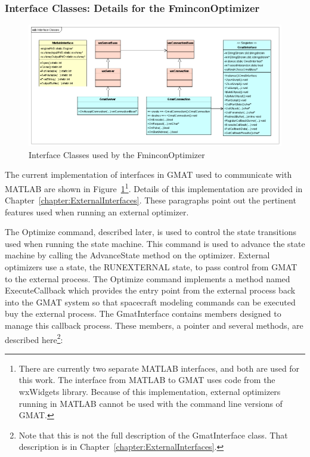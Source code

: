 \subsubsection{Interface Classes: Details for the FminconOptimizer}

\begin{figure}[htb]
\begin{center}
\includegraphics[460,221]{Images/InterfaceClasses.png}
\caption{\label{figure:InterfaceClasses}Interface Classes used by the FminconOptimizer}
\end{center}
\end{figure}

The current implementation of interfaces in GMAT used to communicate with MATLAB are shown in
Figure~\ref{figure:InterfaceClasses}\footnote{There are currently two separate MATLAB interfaces,
and both are used for this work.  The interface from MATLAB to GMAT uses code from the wxWidgets
library.  Because of this implementation, external optimizers running in MATLAB cannot be used with
the command line versions of GMAT.}.  Details of this implementation are provided in
Chapter~\ref{chapter:ExternalInterfaces}.  These paragraphs point out the pertinent features used
when running an external optimizer.

The Optimize command, described later, is used to control the state transitions used when running
the state machine.  This command is used to advance the state machine by calling the AdvanceState
method on the optimizer.  External optimizers use a state, the RUNEXTERNAL state, to pass control
from GMAT to the external process.  The Optimize command implements a method named ExecuteCallback
which provides the entry point from the external process back into the GMAT system so that
spacecraft modeling commands can be executed buy the external process.  The GmatInterface contains
members designed to manage this callback process.  These members, a pointer and several methods, are
described here\footnote{Note that this is not the full description of the GmatInterface class. That
description is in Chapter~\ref{chapter:ExternalInterfaces}.}:

